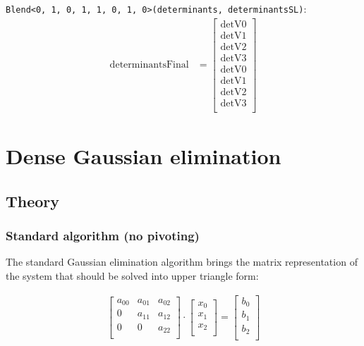 \documentclass[]{scrartcl}
\begin{document}
\texttt{Blend<0, 1, 0, 1, 1, 0, 1, 0>(determinants, determinantsSL)}:
\begin{align*}
\mathrm{determinantsFinal} 
&=
\begin{bmatrix}
\mathrm{detV0}\\
\mathrm{detV1}\\
\mathrm{detV2}\\
\mathrm{detV3}\\
\mathrm{detV0}\\
\mathrm{detV1}\\
\mathrm{detV2}\\
\mathrm{detV3}\\
\end{bmatrix}
\end{align*}

\section{Dense Gaussian elimination}

\subsection{Theory}

\subsubsection{Standard algorithm (no pivoting)}
The standard Gaussian elimination algorithm brings the matrix representation of the system that should be solved into upper triangle form:


\begin{align}
\label{eq:gauss3x3upperTriangle}
\begin{bmatrix}
a_{00}&a_{01}&a_{02}\\
0&a_{11}&a_{12}\\
0&0&a_{22}\\
\end{bmatrix}
\cdot
\begin{bmatrix}
x_0\\
x_1\\
x_2\\
\end{bmatrix}
=
\begin{bmatrix}
b_0\\
b_1\\
b_2\\
\end{bmatrix}
\end{align}
\end{document}
